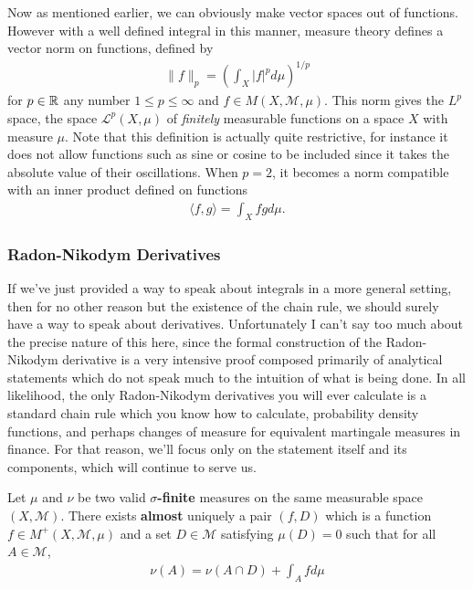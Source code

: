 \documentclass[11pt]{article}
\begin{document}
Now as mentioned earlier, we can obviously make vector spaces out of functions. However with a well defined integral in this manner, measure theory defines a vector norm on functions, defined by \begin{gather*}
\lVert f \rVert_p = \left(\int_X |f|^p d \mu \right)^{1/p}
\end{gather*}
for $p \in \mathbb{R}$ any number $1 \le p \le \infty $ and $f \in M(X, \mathcal M, \mu)$. This norm gives the $L^p$ space, the space $\mathcal L^p(X,\mu)$ of \emph{finitely} measurable functions on a space $X$ with measure $\mu$. Note that this definition is actually quite restrictive, for instance it does not allow functions such as sine or cosine to be included since it takes the absolute value of their oscillations. When $p=2$, it becomes a norm compatible with an inner product defined on functions \begin{gather*}
\langle f, g \rangle = \int_X f g d\mu.
\end{gather*}

\subsubsection{Radon-Nikodym Derivatives}

If we've just provided a way to speak about integrals in a more general setting, then for no other reason but the existence of the chain rule, we should surely have a way to speak about derivatives. Unfortunately I can't say too much about the precise nature of this here, since the formal construction of the Radon-Nikodym derivative is a very intensive proof composed primarily of analytical statements which do not speak much to the intuition of what is being done. In all likelihood, the only Radon-Nikodym derivatives you will ever calculate is a standard chain rule which you know how to calculate, probability density functions, and perhaps changes of measure for equivalent martingale measures in finance. For that reason, we'll focus only on the statement itself and its components, which will continue to serve us.

\begin{theorem}
Let $\mu$ and $\nu$ be two valid $\sigma$\textbf{-finite} measures on the same measurable space $(X,\mathcal M)$. There exists \textbf{almost} uniquely a pair $(f,D)$ which is a function $f \in M^+(X,\mathcal M,\mu)$  and a set $D \in \mathcal M$ satisfying $\mu(D) = 0$ such that for all $A \in \mathcal M$,\begin{gather*}
\nu(A) = \nu(A \cap D) + \int_A f d\mu
\end{gather*}
\end{theorem}
\end{document}
